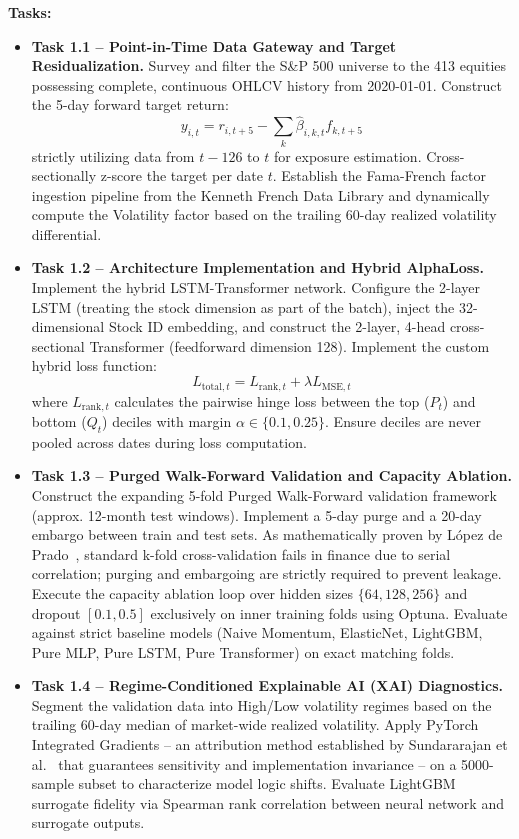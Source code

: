 \documentclass[twoside,final]{hcmut-report}
\begin{document}
\vspace{0.5em}
\textbf{Tasks:}
\begin{itemize}
  \item \textbf{Task 1.1 -- Point-in-Time Data Gateway and Target Residualization.} Survey and filter the S\&P 500 universe to the 413 equities possessing complete, continuous OHLCV history from 2020-01-01. Construct the 5-day forward target return:
        \[
          y_{i,t} = r_{i,t+5} - \sum_{k}\hat{\beta}_{i,k,t}f_{k,t+5}
        \]
        strictly utilizing data from $t-126$ to $t$ for exposure estimation. Cross-sectionally z-score the target per date $t$. Establish the Fama-French factor ingestion pipeline from the Kenneth French Data Library and dynamically compute the Volatility factor based on the trailing 60-day realized volatility differential.

  \item \textbf{Task 1.2 -- Architecture Implementation and Hybrid AlphaLoss.} Implement the hybrid LSTM-Transformer network. Configure the 2-layer LSTM (treating the stock dimension as part of the batch), inject the 32-dimensional Stock ID embedding, and construct the 2-layer, 4-head cross-sectional Transformer (feedforward dimension 128). Implement the custom hybrid loss function:
        \[
          L_{\text{total},t} = L_{\text{rank},t} + \lambda L_{\text{MSE},t}
        \]
        where $L_{\text{rank},t}$ calculates the pairwise hinge loss between the top ($P_t$) and bottom ($Q_t$) deciles with margin $\alpha \in \{0.1, 0.25\}$. Ensure deciles are never pooled across dates during loss computation.

  \item \textbf{Task 1.3 -- Purged Walk-Forward Validation and Capacity Ablation.} Construct the expanding 5-fold Purged Walk-Forward validation framework (approx. 12-month test windows). Implement a 5-day purge and a 20-day embargo between train and test sets. As mathematically proven by López de Prado~\cite{LopezdePrado2018}, standard k-fold cross-validation fails in finance due to serial correlation; purging and embargoing are strictly required to prevent leakage. Execute the capacity ablation loop over hidden sizes $\{64, 128, 256\}$ and dropout $[0.1, 0.5]$ exclusively on inner training folds using Optuna. Evaluate against strict baseline models (Naive Momentum, ElasticNet, LightGBM, Pure MLP, Pure LSTM, Pure Transformer) on exact matching folds.

  \item \textbf{Task 1.4 -- Regime-Conditioned Explainable AI (XAI) Diagnostics.} Segment the validation data into High/Low volatility regimes based on the trailing 60-day median of market-wide realized volatility. Apply PyTorch Integrated Gradients -- an attribution method established by Sundararajan et al.~\cite{Sundararajan2017} that guarantees sensitivity and implementation invariance -- on a 5000-sample subset to characterize model logic shifts. Evaluate LightGBM surrogate fidelity via Spearman rank correlation between neural network and surrogate outputs.
\end{itemize}
\end{document}
